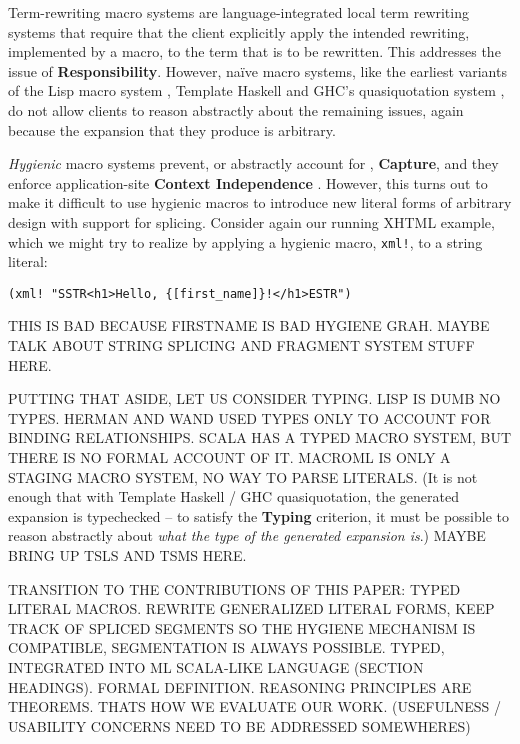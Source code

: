 \documentclass[acmsmall,10pt,review,anonymous]{acmart}\settopmatter{printfolios=true}
\newcommand{\li}[1]{\lstinline{#1}}
\begin{document}
Term-rewriting macro systems are language-integrated local term rewriting systems that require that the client explicitly apply the intended rewriting, implemented by a macro, to the term that is to be rewritten. This addresses the issue of \textbf{Responsibility}. However, na\"ive macro systems, like the earliest variants of the Lisp macro system \cite{Hart63a}, Template Haskell \cite{SheardPeytonJones:Haskell-02} and GHC's quasiquotation system \cite{mainland2007s}, do not allow clients to reason abstractly about the remaining issues, again because the expansion that they produce is arbitrary.

\emph{Hygienic} macro systems prevent, or abstractly account for \cite{DBLP:conf/esop/HermanW08,Herman10:Theory}, \textbf{Capture}, and they enforce application-site \textbf{Context Independence} \cite{Kohlbecker86a,DBLP:conf/popl/Adams15,DBLP:conf/popl/ClingerR91,DBLP:journals/lisp/DybvigHB92}. However, this turns out to make it difficult to use hygienic macros to introduce new literal forms of arbitrary design with support for splicing. Consider again our running XHTML example, which we might try to realize by applying a hygienic macro, \li{xml!}, to a string literal:
\begin{lstlisting}[numbers=none]
  (xml! "SSTR<h1>Hello, {[first_name]}!</h1>ESTR")
\end{lstlisting}
THIS IS BAD BECAUSE FIRSTNAME IS BAD HYGIENE GRAH. MAYBE TALK ABOUT STRING SPLICING AND FRAGMENT SYSTEM STUFF HERE.

PUTTING THAT ASIDE, LET US CONSIDER TYPING. LISP IS DUMB NO TYPES. HERMAN AND WAND USED TYPES ONLY TO ACCOUNT FOR BINDING RELATIONSHIPS. SCALA HAS A TYPED MACRO SYSTEM, BUT THERE IS NO FORMAL ACCOUNT OF IT. MACROML IS ONLY A STAGING MACRO SYSTEM, NO WAY TO PARSE LITERALS. (It is not enough that with Template Haskell / GHC quasiquotation, the generated expansion is typechecked -- to satisfy the \textbf{Typing} criterion, it must be possible to reason abstractly about \emph{what the type of the generated expansion is}.) MAYBE BRING UP TSLS AND TSMS HERE.

TRANSITION TO THE CONTRIBUTIONS OF THIS PAPER: TYPED LITERAL MACROS. REWRITE GENERALIZED LITERAL FORMS, KEEP TRACK OF SPLICED SEGMENTS SO THE HYGIENE MECHANISM IS COMPATIBLE, SEGMENTATION IS ALWAYS POSSIBLE. TYPED, INTEGRATED INTO ML SCALA-LIKE LANGUAGE (SECTION HEADINGS). FORMAL DEFINITION. REASONING PRINCIPLES ARE THEOREMS. THATS HOW WE EVALUATE OUR WORK. (USEFULNESS / USABILITY CONCERNS NEED TO BE ADDRESSED SOMEWHERES)
\end{document}
